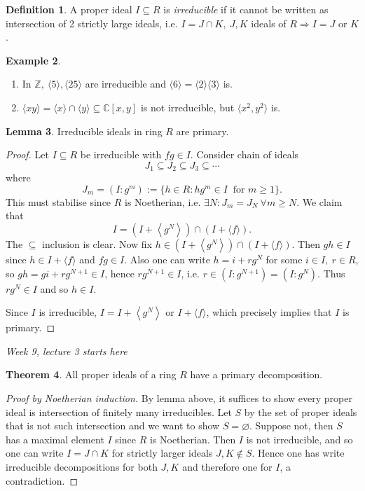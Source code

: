 \documentclass[a4paper]{article}
\newcommand{\la}{\langle}
\newcommand{\ra}{\rangle}
\newcommand{\Z}{\mathbb Z}
\newcommand{\C}{\mathbb C}
\theoremstyle{definition}
\newtheorem{defn}{Definition}[subsection]
\newtheorem{thm}[defn]{Theorem}
\newtheorem{lemma}[defn]{Lemma}
\newtheorem{example}[defn]{Example}
\begin{document}
\begin{defn}
A proper ideal $I\subseteq R$ is \textit{irreducible} if it cannot be written as intersection of 2 strictly large ideals, i.e. $I=J\cap K,\ J,K$ ideals of $R \Rightarrow I=J$ or $K$.
\end{defn}

\begin{example}
\begin{enumerate}
\item In $\Z,\ \la 5\ra,\la 25\ra$ are irreducible and $\la 6\ra=\la 2\ra\la 3\ra$ is.
\item $\la xy\ra=\la x\ra\cap\la y\ra\subseteq\C[x,y]$ is not irreducible, but $\la x^2,y^2\ra$ is.
\end{enumerate}
\end{example}

\begin{lemma}
Irreducible ideals in ring $R$ are primary.
\end{lemma}
\begin{proof}
Let $I\subseteq R$ be irreducible with $fg\in I$. Consider chain of ideals
\[
J_1\subseteq J_2\subseteq J_3\subseteq \cdots
\]
where
\[
J_m=(I:g^m):=\{h\in R:hg^m\in I \ \text{ for }m\geq 1\}.
\]
This must stabilise since $R$ is Noetherian, i.e. $\exists N:J_m=J_N \ \forall m\geq N$. We claim that
\[
I=\left(I+\left\la g^N\right\ra\right)\cap (I+\la f\ra).
\]
The $\subseteq$ inclusion is clear. Now fix $h\in\left(I+\left\la g^N\right\ra\right)\cap (I+\la f\ra)$. Then $gh\in I$ since $h\in I+\la f\ra$ and $fg\in I$. Also one can write $h=i+rg^N$ for some $i\in I,\ r\in R$, so $gh=gi+rg^{N+1} \in I$, hence $rg^{N+1}\in I$, i.e. $r\in (I:g^{N+1})=(I:g^N)$. Thus $rg^N\in I$ and so $h\in I$.

Since $I$ is irreducible, $I=I+\left\la g^N\right\ra$ or $I+\la f\ra$, which precisely implies that $I$ is primary.
\end{proof}

\begin{flushright}
\textit{Week 9, lecture 3 starts here}
\end{flushright}

\begin{thm}
All proper ideals of a ring $R$ have a primary decomposition.
\end{thm}
\begin{proof}[Proof by Noetherian induction]
By lemma above, it suffices to show every proper ideal is intersection of finitely many irreducibles. Let $S$ by the set of proper ideals that is not such intersection and we want to show $S=\varnothing$. Suppose not, then $S$ has a maximal element $I$ since $R$ is Noetherian. Then $I$ is not irreducible, and so one can write $I=J\cap K$ for strictly larger ideals $J,K\notin S$. Hence one has write irreducible decompositions for both $J,K$ and therefore one for $I$, a contradiction.
\end{proof}
\end{document}
